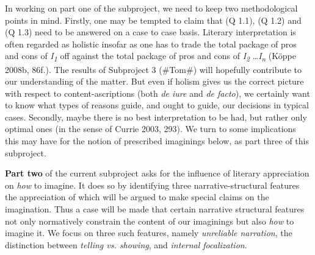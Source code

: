 \noindent In working on part one of the subproject, we need to keep two
methodological points in mind. Firstly, one may be tempted to claim that
(Q 1.1), (Q 1.2) and (Q 1.3) need to be answered on a case to case
basis. Literary interpretation is often regarded as holistic insofar as
one has to trade the total package of pros and cons of
\emph{I\textsubscript{1}} off against the total package of pros and cons
of \emph{I\textsubscript{2}} \ldots \emph{I\textsubscript{n}} (K\"oppe
2008b, 86f.). The results of {Subproject 3 (\#Tom\#)} will hopefully
contribute to our understanding of the matter. But even if holism gives
us the correct picture with respect to content-ascriptions (both
\emph{de iure} and \emph{de facto}), we certainly want to know what
types of reasons guide, and ought to guide, our decisions in typical
cases. Secondly, maybe there is no best interpretation to be had, but
rather only optimal ones (in the sense of Currie 2003, 293). We turn to
some implications this may have for the notion of prescribed imaginings
below, as part three of this subproject.

\textbf{Part two} of the current subproject asks for the influence of
literary appreciation on \emph{how} to imagine. It does so by
identifying three narrative-structural features the appreciation of
which will be argued to make special claims on the imagination. Thus a
case will be made that certain narrative structural features not only
normatively constrain the content of our imaginings but also \emph{how}
to imagine it. We focus on three such features, namely \emph{unreliable
narration}, the distinction between \emph{telling vs. showing}, and
\emph{internal focalization}.

